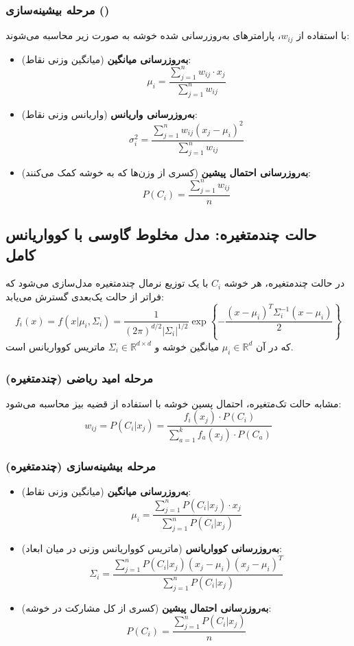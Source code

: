 \documentclass{article}
\begin{document}
\subsubsection*{مرحله بیشینه‌سازی ()}
با استفاده از $w_{ij}$، پارامترهای به‌روزرسانی شده خوشه به صورت زیر محاسبه می‌شوند:
\begin{itemize}
    \item \textbf{به‌روزرسانی میانگین} (میانگین وزنی نقاط):
    \[
    \mu_i = \frac{\sum_{j=1}^{n} w_{ij} \cdot x_j}{\sum_{j=1}^{n} w_{ij}}
    \]
    \item \textbf{به‌روزرسانی واریانس} (واریانس وزنی نقاط):
    \[
    \sigma_i^2 = \frac{\sum_{j=1}^{n} w_{ij} (x_j - \mu_i)^2}{\sum_{j=1}^{n} w_{ij}}
    \]
    \item \textbf{به‌روزرسانی احتمال پیشین} (کسری از وزن‌ها که به خوشه کمک می‌کنند):
    \[
    P(C_i) = \frac{\sum_{j=1}^{n} w_{ij}}{n}
    \]
\end{itemize}

\subsection*{حالت چندمتغیره: مدل مخلوط گاوسی با کوواریانس کامل}
در حالت چندمتغیره، هر خوشه $C_i$ با یک توزیع نرمال چندمتغیره مدل‌سازی می‌شود که فراتر از حالت یک‌بعدی گسترش می‌یابد:
\[
f_i(x) = f(x|\mu_i, \Sigma_i) = \frac{1}{(2\pi)^{d/2} |\Sigma_i|^{1/2}} \exp \left\{ -\frac{(x - \mu_i)^T \Sigma_i^{-1} (x - \mu_i)}{2} \right\}
\]
که در آن $\mu_i \in \mathbb{R}^d$ میانگین خوشه و $\Sigma_i \in \mathbb{R}^{d \times d}$ ماتریس کوواریانس است.

\subsubsection*{مرحله امید ریاضی (چندمتغیره)}
مشابه حالت تک‌متغیره، احتمال پسین خوشه با استفاده از قضیه بیز محاسبه می‌شود:
\[
w_{ij} = P(C_i|x_j) = \frac{f_i(x_j) \cdot P(C_i)}{\sum_{a=1}^{k} f_a(x_j) \cdot P(C_a)}
\]

\subsubsection*{مرحله بیشینه‌سازی (چندمتغیره)}
\begin{itemize}
    \item \textbf{به‌روزرسانی میانگین} (میانگین وزنی نقاط):
    \[
    \mu_i = \frac{\sum_{j=1}^{n} P(C_i|x_j) \cdot x_j}{\sum_{j=1}^{n} P(C_i|x_j)}
    \]
    \item \textbf{به‌روزرسانی کوواریانس} (ماتریس کوواریانس وزنی در میان ابعاد):
    \[
    \Sigma_i = \frac{\sum_{j=1}^{n} P(C_i|x_j)(x_j - \mu_i)(x_j - \mu_i)^T}{\sum_{j=1}^{n} P(C_i|x_j)}
    \]
    \item \textbf{به‌روزرسانی احتمال پیشین} (کسری از کل مشارکت در خوشه):
    \[
    P(C_i) = \frac{\sum_{j=1}^{n} P(C_i|x_j)}{n}
    \]
\end{itemize}
\end{document}
